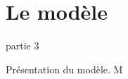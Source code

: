 \section{Le modèle}

\begin{frame}{partie 3}
  \vspace{0.45cm}
  \begin{pointcle}
    \centering\large
    Présentation du modèle. M
  \end{pointcle}
\end{frame}

